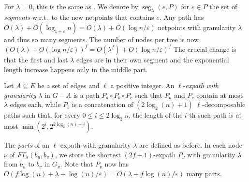 \documentclass{theoretics}
\DeclareMathOperator{\seg}{seg}
\renewcommand{\le}{\leqslant}
\newcommand{\eps}{\varepsilon}
\begin{document}
For $\lambda = 0$, this is the same as .
We denote by $\seg_\lambda(e,P)$ for $e\in P$
the set of \emph{segments} w.r.t.\ to the new netpoints that contains $e$.
Any path has $O(\lambda) + O(\log_{1+\eps}n)= O(\lambda)+ O(\log n/\eps)$ 
netpoints with granularity $\lambda$ and thus so many segments.
The number of nodes per tree is now $(O(\lambda)+O(\log n/\eps))^f = O(\lambda^f) + O(\log n/\eps)^f $
The crucial change is that the first and last $\lambda$ edges are in their own segment
and the exponential length increase happens only in the middle part.

\begin{definition}
\label{definition:l-expath_granularity}
  Let $A \subseteq E$ be a set of edges and $\ell$ a positive integer.
  An $\ell$-\emph{expath with granularity} $\lambda$ in $G{-}A$ is a path
  $P_a \circ P_b \circ P_c$
  such that $P_a$ and $P_c$ contain at most $\lambda$ edges each, 
  while $P_b$ is a concatenation of $(2\log_2(n){+}1)$
  $\ell$-decomposable paths
  such that, for every $0 \le i \le 2\log_2 n$,
  the length of the $i$-th such path is at most $\min(2^i, 2^{2\log_2(n) - i})$.
\end{definition}

The \emph{parts} of an $\ell$-expath with granularity $\lambda$ are defined as before.
In each node $\nu$ of $FT_\lambda(b_u,b_v)$,
we store the shortest $(2f{+}1)$-expath $P_\nu$ with granularity $\lambda$ 
from $b_u$ to $b_v$ in $G_\nu$.
Note that $P_\nu$ now has
$O(f\log(n) + \lambda+ \log(n)/\varepsilon) = O(\lambda+ f\log(n)/\varepsilon)$ many parts.
\vspace*{.5em}
\end{document}
